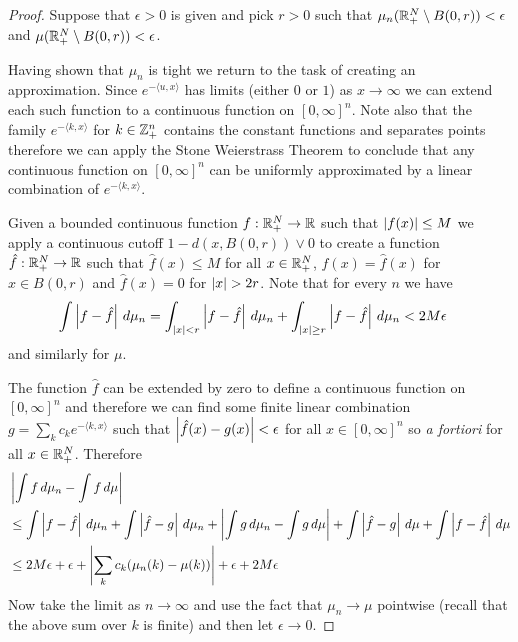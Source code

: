 \begin{proof}
Suppose that $\epsilon > 0$ is given and
pick $r > 0$ such that $\mu_n(\mathbb{R}^N_+ \setminus B(0, r)) <
\epsilon$ and $\mu(\mathbb{R}^N_+ \setminus B(0, r)) < \epsilon$.

Having shown that $\mu_n$ is tight we return to the task of creating
an approximation.  Since $e^{-\langle u,x \rangle}$
has limits (either $0$ or $1$) as $x \to \infty$ we can extend each
such function to
a continuous function on $[0,\infty]^n$.  Note also that the family $e^{-\langle k, x
  \rangle}$ for $k \in \mathbb{Z}^n_+$ contains the constant functions
and separates points therefore we can apply the Stone Weierstrass
Theorem to conclude that any
continuous function on $[0,\infty]^n$ can be uniformly approximated by
a linear combination of $e^{-\langle k, x  \rangle}$. 

Given a bounded continuous function $f : \mathbb{R}^N_+ \to \mathbb{R}$ such
that $\left \vert f(x) \right \vert \leq M$ we
apply a continuous cutoff $1 - d(x,B(0,r)) \vee 0$ to create a function $\hat{f} : \mathbb{R}^N_+
\to \mathbb{R}$ such that $\hat{f}(x) \leq M$ for all $x \in \mathbb{R}^N_+$, $f(x) = \hat{f}(x)$ for $x \in B(0,r)$ and
$\hat{f}(x) = 0$ for $\left \vert x \right \vert > 2r$.  Note that for every $n$ we have
\begin{align*}
\int \left \vert f - \hat{f} \right \vert \, d\mu_n &= 
\int_{\left \vert x \right \vert < r} \left \vert f -  \hat{f} \right \vert \, d\mu_n + 
\int_{\left \vert x \right \vert \geq r} \left \vert f -  \hat{f} \right \vert \, d\mu_n < 2 M \epsilon
\end{align*}
and similarly for $\mu$.

The function $\hat{f}$ can be
extended by zero to define a continuous function on $[0,\infty]^n$ and
therefore we can find some finite linear combination $g = \sum_k c_k
e^{-\langle k, x \rangle}$ such that $\left \vert \hat{f}(x) - g(x) \right \vert<
\epsilon$ for all $x \in [0, \infty]^n$ so \emph{a fortiori} for all $x \in \mathbb{R}^N_+$.  Therefore
\begin{align*}
&\left \vert \int f \, d\mu_n - \int f \, d \mu \right \vert \\
&\leq \int \left \vert f - \hat{f} \right \vert
\, d\mu_n + \int \left \vert \hat{f} - g \right \vert\, d\mu_n + \left \vert \int  g\, d\mu_n -
  \int g \, d\mu \right \vert + \int \left \vert \hat{f} - g \right \vert\, d\mu + \int \left \vert f - \hat{f} \right \vert
\, d\mu \\
&\leq 2M \epsilon + \epsilon + \left \vert \sum_k c_k ( \mu_n(k) - \mu(k)) \right \vert +
\epsilon + 2M \epsilon
\end{align*}
Now take the limit as $n \to \infty$ and use the fact that $\mu_n \to
\mu$ pointwise (recall that the above sum
over $k$ is finite) and then let $\epsilon \to 0$.
\end{proof}

